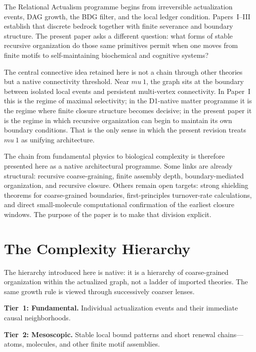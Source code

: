 \documentclass[11pt]{article}
\def\mu{mu}%
\def\approx{~}%
\begin{document}
The Relational Actualism programme begins from irreversible actualization events, DAG growth, the BDG filter, and the local ledger condition. Papers~I--III establish that discrete bedrock together with finite severance and boundary structure. The present paper asks a different question: what forms of stable recursive organization do those same primitives permit when one moves from finite motifs to self-maintaining biochemical and cognitive systems?

The central connective idea retained here is not a chain through other theories but a native connectivity threshold. Near $\mu \approx 1$, the graph sits at the boundary between isolated local events and persistent multi-vertex connectivity. In Paper~I this is the regime of maximal selectivity; in the D1-native matter programme it is the regime where finite closure structure becomes decisive; in the present paper it is the regime in which recursive organization can begin to maintain its own boundary conditions. That is the only sense in which the present revision treats $\mu \approx 1$ as unifying architecture.

The chain from fundamental physics to biological complexity is therefore presented here as a native architectural programme. Some links are already structural: recursive coarse-graining, finite assembly depth, boundary-mediated organization, and recursive closure. Others remain open targets: strong shielding theorems for coarse-grained boundaries, first-principles turnover-rate calculations, and direct small-molecule computational confirmation of the earliest closure windows. The purpose of the paper is to make that division explicit.

\section{The Complexity Hierarchy}
\label{sec:hierarchy}

The hierarchy introduced here is native: it is a hierarchy of coarse-grained organization within the actualized graph, not a ladder of imported theories. The same growth rule is viewed through successively coarser lenses.

\textbf{Tier~1: Fundamental.} Individual actualization events and their immediate causal neighborhoods.

\textbf{Tier~2: Mesoscopic.} Stable local bound patterns and short renewal chains---atoms, molecules, and other finite motif assemblies.
\end{document}
